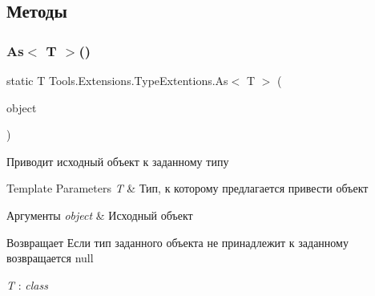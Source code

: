 \subsection{Методы}
\mbox{\label{class_tools_1_1_extensions_1_1_type_extentions_afebefec48afd27496ef33e4428cdd632}} 
\subsubsection{\texorpdfstring{As$<$ T $>$()}{As< T >()}}
{\footnotesize\ttfamily static T Tools.\+Extensions.\+Type\+Extentions.\+As$<$ T $>$ (\begin{DoxyParamCaption}\item[{this object @}]{object }\end{DoxyParamCaption})\hspace{0.3cm}{\ttfamily [static]}}



Приводит исходный объект к заданному типу 


\begin{DoxyTemplParams}{Template Parameters}
{\em T} & Тип, к которому предлагается привести объект\\
\hline
\end{DoxyTemplParams}

\begin{DoxyParams}{Аргументы}
{\em object} & Исходный объект\\
\hline
\end{DoxyParams}
\begin{DoxyReturn}{Возвращает}
Если тип заданного объекта не принадлежит к заданному возвращается null
\end{DoxyReturn}
\begin{Desc}
\item[Согласование типов]\begin{description}
\item[{\em T} : {\em class}]\end{description}
\end{Desc}
\mbox{\label{class_tools_1_1_extensions_1_1_type_extentions_ac6091e29fcbbba209a3d8cd7777ff9b1}} 
